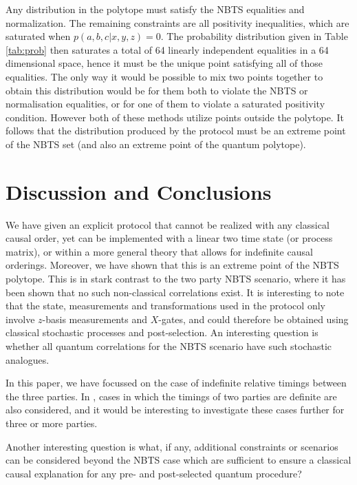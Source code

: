 \documentclass[aps,pra, twocolumn]{revtex4-1}
\begin{document}
 Any distribution in the polytope must satisfy the NBTS equalities and normalization. The remaining constraints are all positivity inequalities, which are saturated when $p(a,b,c|x,y,z)=0$. The probability distribution given in Table \ref{tab:prob} then saturates a total of 64 linearly independent equalities in a 64 dimensional space, hence it must be the unique point satisfying all of those equalities. The only way it would be possible to mix two points together to obtain this distribution would be for them both to violate the NBTS or normalisation equalities, or for one of them to violate a saturated positivity condition. However both of these methods utilize points outside the polytope. It follows that the distribution produced by the protocol must  
 be an extreme point of the NBTS set (and also an extreme point of the quantum polytope). 

\section{Discussion and Conclusions}

We have given an explicit protocol that cannot be realized with any classical causal order, yet can be implemented with a linear two time state (or process matrix), or within a more general theory that allows for indefinite causal orderings. Moreover, we have shown that this is  an extreme point of the NBTS polytope. This is in stark contrast to the two party NBTS scenario, where it has been shown that no such non-classical correlations exist. It is interesting to note that  the state, measurements and transformations used in the protocol only involve $z$-basis measurements and $X$-gates, and could therefore be obtained using classical stochastic processes and post-selection. An interesting question is whether all quantum correlations for the NBTS scenario have such stochastic analogues.  

In this paper, we have focussed on the case of indefinite relative timings between the three parties. In \cite{polytope}, cases in which the timings of two parties are definite are also considered, and it would be interesting to investigate these cases further for three or more parties. 

Another interesting question is what, if any, additional constraints or scenarios can be considered beyond the NBTS case which are sufficient to ensure a classical causal explanation for any pre- and post-selected quantum procedure? 
 
 \acknowledgements
 
\end{document}
